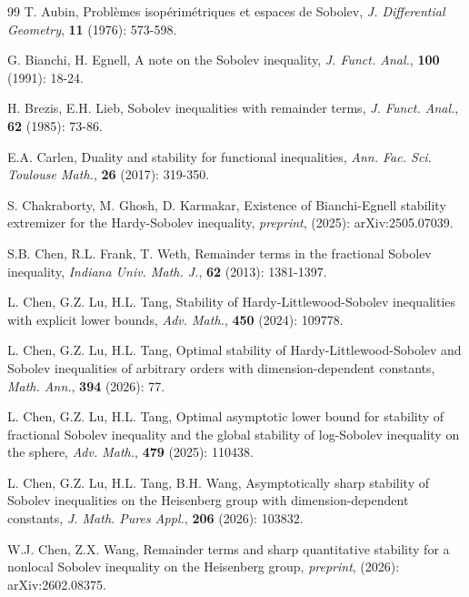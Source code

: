 \documentclass[11pt]{article}
\begin{document}

\begin{thebibliography}{99}
 T. Aubin,
Probl\`{e}mes isop\'{e}rim\'{e}triques et espaces de Sobolev,
{\em J. Differential Geometry}, {\bf 11} (1976): 573-598.



 G. Bianchi, H. Egnell,
A note on the Sobolev inequality,
{\em J. Funct. Anal.}, {\bf 100} (1991): 18-24.


 H. Brezis, E.H. Lieb,
Sobolev inequalities with remainder terms,
{\em J. Funct. Anal.}, {\bf 62} (1985): 73-86.

 E.A. Carlen,
Duality and stability for functional inequalities, {\em Ann. Fac. Sci. Toulouse Math.},  {\bf 26}
(2017): 319-350.

 S. Chakraborty, M. Ghosh, D. Karmakar,
Existence of Bianchi-Egnell stability extremizer for the Hardy-Sobolev inequality,
{\em preprint}, (2025): arXiv:2505.07039.



 S.B. Chen, R.L. Frank, T. Weth,
Remainder terms in the fractional Sobolev inequality,
{\em Indiana Univ. Math. J.}, {\bf 62} (2013): 1381-1397.


 L. Chen, G.Z. Lu, H.L. Tang,
Stability of Hardy-Littlewood-Sobolev inequalities with explicit lower bounds, {\em Adv. Math.}, {\bf 450} (2024): 109778.

 L. Chen, G.Z. Lu, H.L. Tang,
Optimal stability of Hardy-Littlewood-Sobolev and Sobolev inequalities of arbitrary orders with dimension-dependent constants,  {\em Math. Ann.}, {\bf 394} (2026): 77.



 L. Chen, G.Z. Lu, H.L. Tang,
Optimal asymptotic lower bound for stability of fractional Sobolev inequality and the global stability of log-Sobolev inequality on the sphere, {\em Adv. Math.}, {\bf 479} (2025): 110438.

 L. Chen, G.Z. Lu, H.L. Tang, B.H. Wang,
Asymptotically sharp stability of Sobolev inequalities on the Heisenberg group
with dimension-dependent constants, {\em J. Math. Pures Appl.}, {\bf 206} (2026): 103832.



 W.J. Chen, Z.X. Wang,
Remainder terms and sharp
quantitative stability for a nonlocal Sobolev inequality on the Heisenberg group,
{\em preprint}, (2026): arXiv:2602.08375.


\end{thebibliography}
\end{document}
